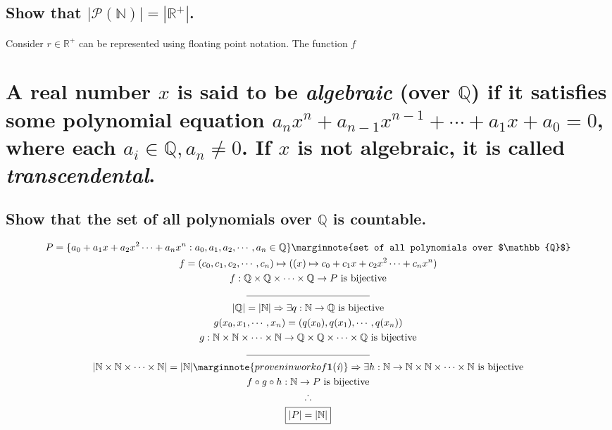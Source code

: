 \documentclass[letterpaper]{article}
\begin{document}
\subsection{Show that $|\mathcal{P}(\mathbb{N})|=|\mathbb{R}^+|$.}
\begin{adjustwidth}{2.35em}{0pt}
Consider $r\in\mathbb{R}^+$ can be represented using floating point notation. The function $f$
\end{adjustwidth}

\section{A real number $x$ is said to be \textit{algebraic} (over $\mathbb{Q}$) if it satisfies some polynomial equation $a_nx^n+a_{n-1}x^{n-1}+\dotsb+a_1x+a_0=0$, where each $a_i\in\mathbb{Q},a_n\neq0$. If $x$ is not algebraic, it is called \textit{transcendental}.}
\subsection{Show that the set of all polynomials over $\mathbb{Q}$ is countable.}
\begin{gather*}
P=\{a_0+a_1x+a_2x^2\dotsb+a_nx^n:a_0,a_1,a_2,\dotsb,a_n\in\mathbb{Q}\} \marginnote{set of all polynomials over $\mathbb{Q}$} \\
f=(c_0,c_1,c_2,\dotsb,c_n)\mapsto((x)\mapsto c_0+c_1x+c_2x^2\dotsb+c_nx^n) \\
f: \mathbb{Q}\times\mathbb{Q}\times\dotsb\times\mathbb{Q}\rightarrow P \text{ is bijective} \\
\line(1, 0){125} \\
|\mathbb{Q}|=|\mathbb{N}|\Rightarrow\exists q:\mathbb{N}\rightarrow\mathbb{Q}\text{ is bijective} \\
g(x_0,x_1,\dotsb,x_n)=(q(x_0),q(x_1),\dotsb,q(x_n)) \\
g:\mathbb{N}\times\mathbb{N}\times\dotsb\times\mathbb{N}\rightarrow\mathbb{Q}\times\mathbb{Q}\times\dotsb\times\mathbb{Q}\text{ is bijective} \\
\line(1, 0){125} \\
|\mathbb{N}\times\mathbb{N}\times\dotsb\times\mathbb{N}|=|\mathbb{N}| \marginnote{proven in work of \textbf{1}(\textit{i})} \Rightarrow \exists h:\mathbb{N}\rightarrow\mathbb{N}\times\mathbb{N}\times\dotsb\times\mathbb{N}\text{ is bijective} \\
f\circ g\circ h:\mathbb{N}\rightarrow P\text{ is bijective} \\
\therefore \\
\boxed{|P|=|\mathbb{N}|}
\end{gather*}
\end{document}
